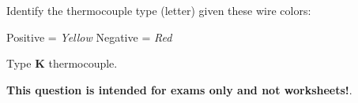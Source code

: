 

Identify the thermocouple type (letter) given these wire colors:

\vskip 10pt

Positive = {\it Yellow} \hskip 50pt Negative = {\it Red}







Type {\bf K} thermocouple.







{\bf This question is intended for exams only and not worksheets!}.


